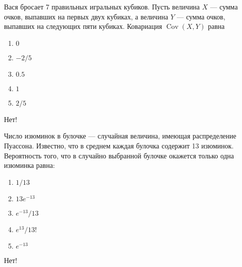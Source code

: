 \documentclass[t]{beamer}
\DeclareMathOperator{\Cov}{Cov}
\begin{document}
 \begin{frame} \label{11-No} 
\begin{block}{11} 

Вася бросает 7 правильных игральных кубиков. Пусть величина  $X$ — сумма очков, выпавших на первых двух кубиках, а величина  $Y$ — сумма очков, выпавших на следующих пяти кубиках. Ковариация $\Cov(X,Y)$ равна
 


 \end{block} 
\begin{enumerate} 
\item[] \hyperlink{11-Yes}{\beamergotobutton{} $0$}
\item[] \hyperlink{11-No}{\beamergotobutton{} $-2/5$
}
\item[] \hyperlink{11-No}{\beamergotobutton{} $0.5$}
\item[] \hyperlink{11-No}{\beamergotobutton{} $1$}
\item[] \hyperlink{11-No}{\beamergotobutton{} $2/5$}
\end{enumerate} 

 \alert{Нет!} 
\end{frame} 


 \begin{frame} \label{12-No} 
\begin{block}{12} 

Число изюминок в булочке — случайная величина, имеющая распределение Пуассона. Известно, что в среднем каждая булочка содержит 13 изюминок. Вероятность того, что в случайно выбранной булочке окажется только одна изюминка равна:
 


 \end{block} 
\begin{enumerate} 
\item[] \hyperlink{12-No}{\beamergotobutton{} $1/13$}
\item[] \hyperlink{12-Yes}{\beamergotobutton{} $13e^{-13}$}
\item[] \hyperlink{12-No}{\beamergotobutton{} $e^{-13}/13$}
\item[] \hyperlink{12-No}{\beamergotobutton{} $e^{13}/13!$}
\item[] \hyperlink{12-No}{\beamergotobutton{} $e^{-13}$}
\end{enumerate} 

 \alert{Нет!} 
\end{frame} 
\end{document}
